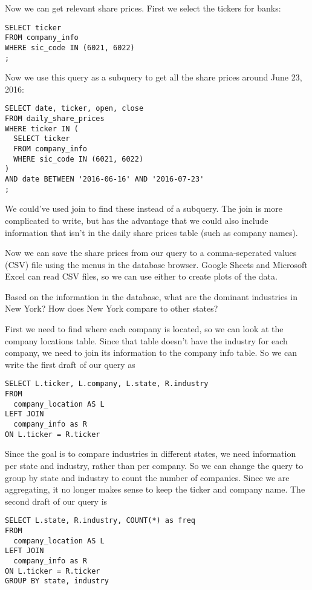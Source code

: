 \documentclass[10pt]{exam}
\begin{document}
\begin{questions}
\begin{solution}
Now we can get relevant share prices. First we select the tickers for banks:
\begin{lstlisting}
SELECT ticker
FROM company_info
WHERE sic_code IN (6021, 6022)
;
\end{lstlisting}
Now we use this query as a subquery to get all the share prices around June 23,
2016:
\begin{lstlisting}
SELECT date, ticker, open, close
FROM daily_share_prices
WHERE ticker IN (
  SELECT ticker
  FROM company_info
  WHERE sic_code IN (6021, 6022)
)
AND date BETWEEN '2016-06-16' AND '2016-07-23'
;
\end{lstlisting}
We could've used join to find these instead of a subquery. The join is more
complicated to write, but has the advantage that we could also include
information that isn't in the daily share prices table (such as company names).

Now we can save the share prices from our query to a comma-seperated values
(CSV) file using the menus in the database browser. Google Sheets and Microsoft
Excel can read CSV files, so we can use either to create plots of the data.
\end{solution}


\question Based on the information in the database, what are the dominant
industries in New York? How does New York compare to other states?

\begin{solution}
First we need to find where each company is located, so we can look at the
company locations table. Since that table doesn't have the industry for each
company, we need to join its information to the company info table. So we can
write the first draft of our query as
\begin{lstlisting}
SELECT L.ticker, L.company, L.state, R.industry
FROM
  company_location AS L
LEFT JOIN
  company_info as R
ON L.ticker = R.ticker
\end{lstlisting}

Since the goal is to compare industries in different states, we need
information per state and industry, rather than per company. So we can change
the query to group by state and industry to count the number of companies.
Since we are aggregating, it no longer makes sense to keep the ticker and
company name. The second draft of our query is
\begin{lstlisting}
SELECT L.state, R.industry, COUNT(*) as freq
FROM
  company_location AS L
LEFT JOIN
  company_info as R
ON L.ticker = R.ticker
GROUP BY state, industry
\end{lstlisting}


\end{solution}
\end{questions}
\end{document}
